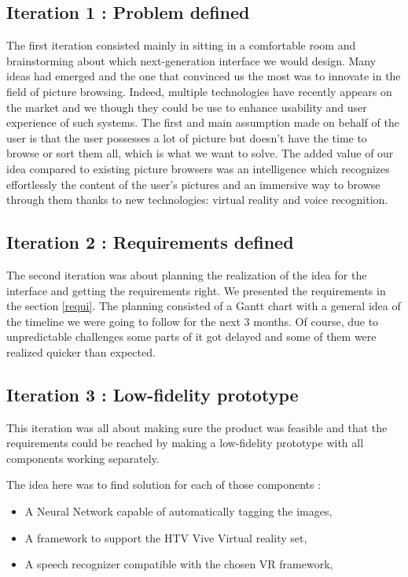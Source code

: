 \documentclass[11pt,a4paper]{article}
\begin{document}
\subsection{Iteration 1 : Problem defined}

The first iteration consisted mainly in sitting in a comfortable room and brainstorming about which next-generation interface we would design. Many ideas had emerged and the one that convinced us the most was to innovate in the field of picture browsing. Indeed, multiple technologies have recently appears on the market and we though they could be use to enhance usability and user experience of such systems.
The first and main assumption made on behalf of the user is that the user possesses a lot of picture but doesn't have the time to browse or sort them all, which is what we want to solve.
The added value of our idea compared to existing picture browsers was an intelligence which recognizes effortlessly the content of the user's pictures and an immersive way to browse through them thanks to new technologies: virtual reality and voice recognition.

\subsection{Iteration 2 : Requirements defined}

The second iteration was about planning the realization of the idea for the interface and getting the requirements right. We presented the requirements in the section \ref{requi}. The planning consisted of a Gantt chart with a general idea of the timeline we were going to follow for the next 3 months. Of course, due to unpredictable challenges some parts of it got delayed and some of them were realized quicker than expected.

\subsection{Iteration 3 : Low-fidelity prototype}

This iteration was all about making sure the product was feasible and that the requirements could be reached by making a low-fidelity prototype with all components working separately.

The idea here was to find solution for each of those components :
\begin{itemize}
	\item A Neural Network capable of automatically tagging the images,
	\item A framework to support the HTV Vive Virtual reality set,
	\item A speech recognizer compatible with the chosen VR framework,
\end{itemize}
\end{document}
